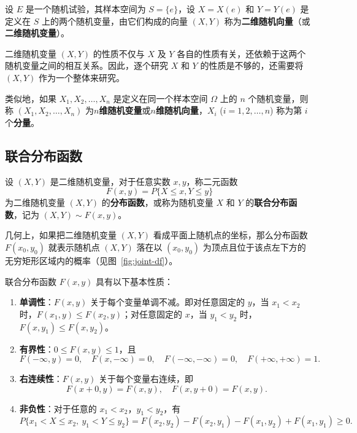 \documentclass[lang=cn,11pt]{elegantbook}
\begin{document}
\begin{definition}[二维随机变量] \label{def:2d-random-variable}
设 $E$ 是一个随机试验，其样本空间为 $S=\{e\}$，设 $X=X(e)$ 和 $Y=Y(e)$ 是定义在 $S$ 上的两个随机变量，由它们构成的向量 $(X,Y)$ 称为\textbf{二维随机向量}（或\textbf{二维随机变量}）。
\end{definition}

\begin{note}
二维随机变量 $(X,Y)$ 的性质不仅与 $X$ 及 $Y$ 各自的性质有关，还依赖于这两个随机变量之间的相互关系。因此，逐个研究 $X$ 和 $Y$ 的性质是不够的，还需要将 $(X,Y)$ 作为一个整体来研究。
\end{note}

类似地，如果 $X_1,X_2,\dots,X_n$ 是定义在同一个样本空间 $\Omega$ 上的 $n$ 个随机变量，则称 $(X_1,X_2,\dots,X_n)$ 为\textbf{$n$维随机变量}或\textbf{$n$维随机向量}，$X_i$ ($i=1,2,\dots,n$) 称为第 $i$ 个\textbf{分量}。

\subsection{联合分布函数}

\begin{definition}[联合分布函数] \label{def:joint-df}
设 $(X,Y)$ 是二维随机变量，对于任意实数 $x,y$，称二元函数
\[
F(x,y) = P\{X \leqslant x, Y \leqslant y\}
\]
为二维随机变量 $(X,Y)$ 的\textbf{分布函数}，或称为随机变量 $X$ 和 $Y$ 的\textbf{联合分布函数}，记为 $(X,Y) \sim F(x,y)$。
\end{definition}

几何上，如果把二维随机变量 $(X,Y)$ 看成平面上随机点的坐标，那么分布函数 $F(x_0, y_0)$ 就表示随机点 $(X,Y)$ 落在以 $(x_0, y_0)$ 为顶点且位于该点左下方的无穷矩形区域内的概率（见图~\ref{fig:joint-df}）。

\begin{property}\label{prop:joint-df}
联合分布函数 $F(x,y)$ 具有以下基本性质：
\begin{enumerate}
    \item \textbf{单调性}：$F(x,y)$ 关于每个变量单调不减。即对任意固定的 $y$，当 $x_1 < x_2$ 时，$F(x_1,y) \leqslant F(x_2,y)$；对任意固定的 $x$，当 $y_1 < y_2$ 时，$F(x,y_1) \leqslant F(x,y_2)$。
    \item \textbf{有界性}：$0 \leqslant F(x,y) \leqslant 1$，且
    \[
    F(-\infty, y) = 0, \quad F(x, -\infty) = 0, \quad F(-\infty, -\infty) = 0, \quad F(+\infty, +\infty) = 1.
    \]
    \item \textbf{右连续性}：$F(x,y)$ 关于每个变量右连续，即
    \[
    F(x+0, y) = F(x,y), \quad F(x, y+0) = F(x,y).
    \]
    \item \textbf{非负性}：对于任意的 $x_1 < x_2$，$y_1 < y_2$，有
    \[
    P\{x_1 < X \leqslant x_2,\ y_1 < Y \leqslant y_2\} = F(x_2,y_2) - F(x_2,y_1) - F(x_1,y_2) + F(x_1,y_1) \geqslant 0.
    \]
\end{enumerate}
\end{property}
\end{document}

